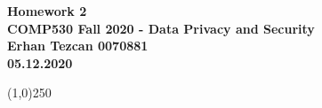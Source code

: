 \documentclass[12pt,reqno]{amsart}
\begin{document}
\begin{center}
\large\textbf{Homework 2 \\ COMP530 Fall 2020 - Data Privacy and Security \\}
\normalsize\textbf{ Erhan Tezcan 0070881 \\ 05.12.2020} \\
\end{center}

\begin{center}
\line(1,0){250}
\end{center}

%
%

\end{document}
